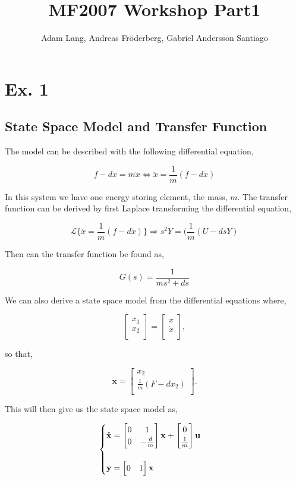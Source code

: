 \documentclass[12pt,a4paper]{article}
\title{MF2007 Workshop Part1}
\author{Adam Lang, Andreas Fr\"{o}derberg, Gabriel Andersson Santiago}
\newcounter{eq}
\newcommand{\eq}[1]{
\begin{equation}
        #1
\end{equation}
    }
\begin{document}
\maketitle
\section{Ex. 1}
  \subsection{State Space Model and Transfer Function}
  The model can be described with the following differential equation,
  \eq{
  f-d\dot{x}=m\ddot{x}\Leftrightarrow \ddot{x}=\frac{1}{m}(f-d\dot{x})
  }
  In this system we have one energy storing element, the mass, $m$. The
  transfer function can be derived by first Laplace transforming the
  differential equation,
  \eq{
  \mathscr{L}\{\ddot{x}=\frac{1}{m}(f-d\dot{x})\}\Rightarrow s^2Y=(\frac{1}{m}(U-dsY)
  }
  Then can the transfer function be found as,
  \eq{
  G(s)=\frac{1}{ms^2+ds}
  }
  We can also derive a state space model from the differential equations
  where,
  \eq{
  \begin{bmatrix}
    x_1 \\
    x_2 \\
  \end{bmatrix}
  =
  \begin{bmatrix}
    x \\
    \dot{x} \\
  \end{bmatrix},
  }
  so that, 
  \eq{
  \mathbf{\dot{x}}=
  \begin{bmatrix}
    x_2\\
    \frac{1}{m}(F-dx_2)\\
  \end{bmatrix}.
  }
  This will then give us the state space model as,
  \eq{
  \begin{cases}
  \mathbf{\dot{x}}=
  \begin{bmatrix}
    0 & 1 \\
    0 & -\frac{d}{m} \\
  \end{bmatrix}
  \mathbf{x}+
  \begin{bmatrix}
    0 \\
    \frac{1}{m} \\
  \end{bmatrix}
  \mathbf{u}\\
  \vspace{0.02cm} \\
  \mathbf{y}=
  \begin{bmatrix}
    0 & 1\\
  \end{bmatrix}
  \mathbf{x}
\end{cases}
  }
\end{document}

